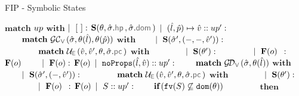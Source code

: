 \begin{algorithm}
\caption{FIP - Symbolic States}\label{fip:symb:states}
\begin{algorithmic}[1]
    \State $\textbf{match}$ $up$ $\textbf{with}$
    \State $\mid~[ \ ]:$ \Return $\success{\subst, \sstate.\hpsel, \sstate.\domsel}$
    \State $\mid~(\hat{l}, \hat{p}) \mapsto \hat{v} :: up' :$ 
    \State $\qquad \textbf{match} \ \GetCellV{\sstate, \subst(\sloc), \subst(\sexprp)}$ $\textbf{with}$
    \State $\qquad \mid~\textbf{S}(\hat{\sigma}', (-, -, \hat{v}')):$
    \State $\qquad \qquad \textbf{match} \ \unifylexpr(\sexprv, \sexprv', \subst, \sstate.\pcsel)$ $\textbf{with}$
     \State $\qquad \qquad \mid~ \textbf{S}(\theta'):$ \Return {}
      \State $\qquad \qquad \mid~ \textbf{F}(o) \ \, :$ \Return $\textbf{F}(o)$
      \State $\qquad \mid~\textbf{F}(o):$ \Return $\textbf{F}(o)$
     \State $\mid~\texttt{noProps}(\hat{l}, \hat{v}) :: up' :$  
       \State $\qquad \textbf{match} \ \GetDomainV{\sstate, \subst(\sloc)}$ $\textbf{with}$
       \State $\qquad \mid~\textbf{S}(\hat{\sigma}', (-, \hat{v}')):$
         \State $\qquad \qquad \textbf{match} \ \unifylexpr(\sexprv, \sexprv', \subst, \sstate.\pcsel)$ $\textbf{with}$
       \State $\qquad \qquad \mid~ \textbf{S}(\theta'):$ \Return {}
       \State $\qquad \qquad \mid~ \textbf{F}(o) \ \, :$ \Return $\textbf{F}(o)$
     \State $\mid~S :: up' :$   
      \State $\qquad \textbf{if} \, (\texttt{fv}(S) \not\subseteq \texttt{dom}(\theta))$ %
      \State $\qquad \qquad \textbf{then}$ 
\EndFunction
\end{algorithmic}
\end{algorithm}


%
%


